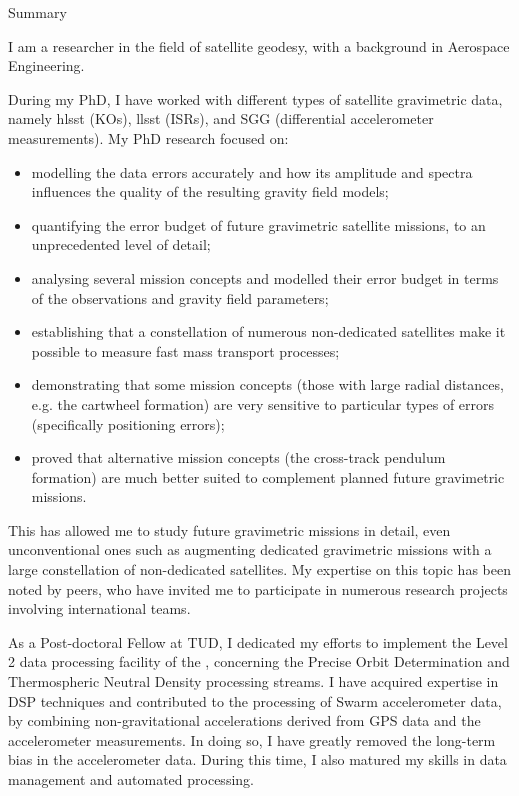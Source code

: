 
\begin{cvtext}{Summary}

I am a researcher in the field of satellite geodesy, with a background in Aerospace Engineering.

During my PhD, I have worked with different types of satellite gravimetric data, namely \acl{hlsst} (\aclp{KO}), \acl{llsst} (\aclp{ISR}), and \acl{SGG} (differential accelerometer measurements).
My PhD research focused on:
\begin{itemize}[topsep=0pt,itemsep=1pt,parsep=0pt,partopsep=0pt]
\item modelling the data errors accurately and how its amplitude and spectra influences the quality of the resulting gravity field models;
\item quantifying the error budget of future gravimetric satellite missions, to an unprecedented level of detail;
\item analysing several mission concepts and modelled their error budget in terms of the observations and gravity field parameters;
\item establishing that a constellation of numerous non-dedicated satellites make it possible to measure fast mass transport processes;
\item demonstrating that some mission concepts (those with large radial distances, \acs{e.g.} the cartwheel formation) are very sensitive to particular types of errors (specifically positioning errors); %
\item proved that alternative mission concepts (the cross-track pendulum formation) are much better suited to complement planned future gravimetric missions.%
\end{itemize}
This has allowed me to study future gravimetric missions in detail, even unconventional ones such as augmenting dedicated gravimetric missions with a large constellation of non-dedicated satellites.
My expertise on this topic has been noted by peers, who have invited me to participate in numerous research projects involving international teams.

As a Post-doctoral Fellow at \ac{TUD}, I dedicated my efforts to implement the Level 2 data processing facility of the , concerning the Precise Orbit Determination and Thermospheric Neutral Density processing streams.
I have acquired expertise in \ac{DSP} techniques and contributed to the processing of Swarm accelerometer data, by combining non-gravitational accelerations derived from \ac{GPS} data and the accelerometer measurements.
In doing so, I have greatly removed the long-term bias in the accelerometer data.
During this time, I also matured my skills in data management and automated processing.


\end{cvtext}
